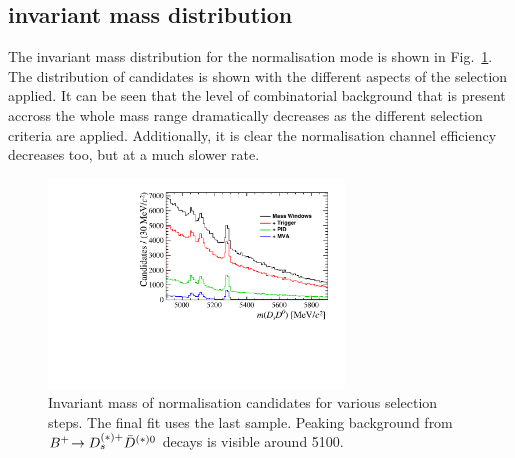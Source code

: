 \subsection{\Bp invariant mass distribution}

The \Bp invariant mass distribution for the normalisation mode is shown in Fig.~\ref{fig:norm_selection}. The distribution of candidates is shown with the different aspects of the selection applied. It can be seen that the level of combinatorial background that is present accross the whole mass range dramatically decreases as the different selection criteria are applied. Additionally, it is clear the normalisation channel efficiency decreases too, but at a much slower rate.


\begin{figure}[!h]
    \centering
        \includegraphics[width=0.7\textwidth]{figs/Selection/Normalisation_with_sel_B2DsD0.pdf}
    \caption{Invariant mass of normalisation candidates for various selection steps. The final fit uses the last sample. Peaking background from ${{{B}^+}}\!\rightarrow D_{s}^{(*)+}\bar{D}^{(*)0}$ decays is visible around 5100\mevcc.}
    \label{fig:norm_selection}   
\end{figure}


